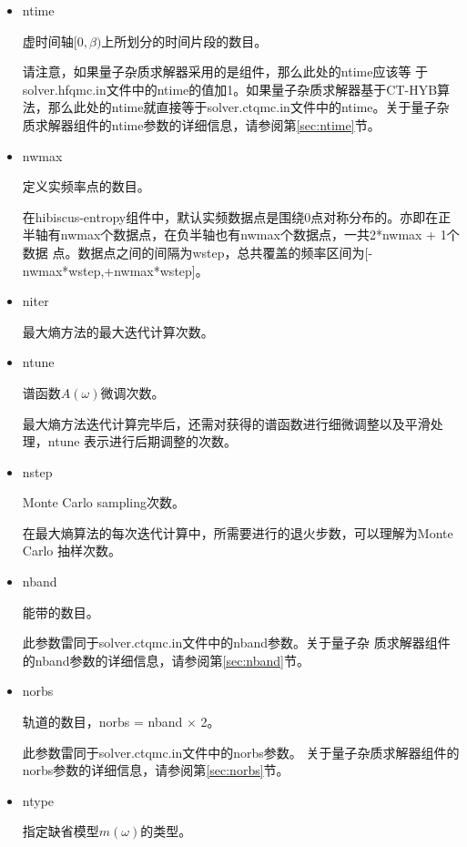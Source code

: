 \begin{itemize}
\item {\color{red}ntime}

虚时间轴$[0,\beta)$上所划分的时间片段的数目。

请注意，如果量子杂质求解器采用的是{\daisy}组件，那么此处的ntime应该等
于solver.hfqmc.in文件中的ntime的值加1。如果量子杂质求解器基于CT-HYB算
法，那么此处的ntime就直接等于solver.ctqmc.in文件中的ntime。关于量子杂
质求解器组件的ntime参数的详细信息，请参阅第\ref{sec:ntime}节。

\item {\color{red}nwmax}

定义实频率点的数目。

在hibiscus-entropy组件中，默认实频数据点是围绕0点对称分布的。亦即在正
半轴有nwmax个数据点，在负半轴也有nwmax个数据点，一共2*nwmax + 1个数据
点。数据点之间的间隔为wstep，总共覆盖的频率区间为[-nwmax*wstep,+nwmax*wstep]。

\item {\color{red}niter}

最大熵方法的最大迭代计算次数。

\item {\color{red}ntune}

谱函数$A(\omega)$微调次数。

最大熵方法迭代计算完毕后，还需对获得的谱函数进行细微调整以及平滑处理，ntune
表示进行后期调整的次数。

\item {\color{red}nstep}

Monte Carlo sampling次数。

在最大熵算法的每次迭代计算中，所需要进行的退火步数，可以理解为Monte Carlo
抽样次数。

\item {\color{red}nband}

能带的数目。

此参数雷同于solver.ctqmc.in文件中的nband参数。关于量子杂
质求解器组件的nband参数的详细信息，请参阅第\ref{sec:nband}节。

\item {\color{red}norbs}

轨道的数目，norbs = nband $ \times $ 2。

此参数雷同于solver.ctqmc.in文件中的norbs参数。
关于量子杂质求解器组件的norbs参数的详细信息，请参阅第\ref{sec:norbs}节。

\item {\color{red}ntype}

指定缺省模型$m(\omega)$的类型。


\end{itemize}
